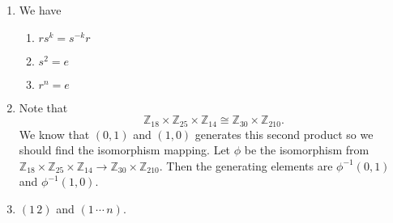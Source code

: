 \begin{sol}
\begin{enumerate}[label=(\alph*)]
    \item We have
    \begin{enumerate}[label=(\roman*)]
        \item $rs^k = s^{-k}r$
        \item $s^2 = e$
        \item $r^n = e$
    \end{enumerate}
    \item Note that
    $$\mathbb{Z}_{18} \times \mathbb{Z}_{25} \times \mathbb{Z}_{14} \cong \mathbb{Z}_{30} \times \mathbb{Z}_{210}.$$ We know that $(0,1)$ and $(1,0)$ generates this second product so we should find the isomorphism mapping. Let $\phi$ be the isomorphism from $\mathbb{Z}_{18} \times \mathbb{Z}_{25} \times \mathbb{Z}_{14} \rightarrow \mathbb{Z}_{30} \times \mathbb{Z}_{210}$. 
    Then the generating elements are $\phi^{-1}(0,1)$ and $\phi^{-1}(1,0)$.
    \item $(1\,2)$ and $(1\,\cdots\,n)$.
\end{enumerate}
\end{sol}